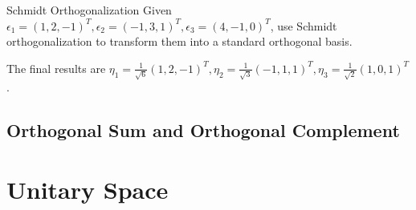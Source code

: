 \begin{example}{Schmidt Orthogonalization}{}
  Given $\epsilon_1 = (1, 2, -1)^T, \epsilon_2 = (-1,3,1)^T, \epsilon_3 =
  (4,-1,0)^T$,
  use Schmidt orthogonalization to transform them into a standard orthogonal basis.
\end{example}

\begin{solution}
  The final results are $\eta_{1}=\frac{1}{\sqrt{6}}(1,2,-1)^{T},\eta_{2}=\frac{1}{\sqrt{3}}(-1,1,1)^{T},\eta_{3}=\frac{1}{\sqrt{2}}(1,0,1)^{T}$.
\end{solution}

\subsection{Orthogonal Sum and Orthogonal Complement}


\section{Unitary Space}









